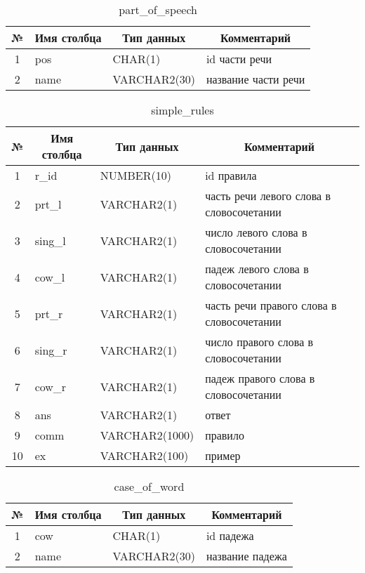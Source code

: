 \documentclass[main]{subfiles}
\begin{document}
\begin{table}[!h]
	\begin{center}
		\captionsetup{format=hang,labelsep = endash, singlelinecheck=false}
		\caption{part\_of\_speech}
		\begin{tabular}{|c|l|l|l|}
			\hline
			\textbf{№} & \multicolumn{1}{c|}{\textbf{Имя столбца}} & \multicolumn{1}{c|}{\textbf{Тип данных}} & \multicolumn{1}{c|}{\textbf{Комментарий}} \\ \hline
			1&pos &CHAR(1) & id части речи \\ \hline
			2& name& VARCHAR2(30) & название части речи \\ \hline
		\end{tabular}
	\end{center}
\end{table}
\begin{table}[!h]
	\begin{center}
		\captionsetup{format=hang,labelsep = endash, singlelinecheck=false}
		\caption{simple\_rules}
		\begin{tabular}{|c|l|l|p{220px}|}
			\hline
			\textbf{№} & \multicolumn{1}{c|}{\textbf{Имя столбца}} & \multicolumn{1}{c|}{\textbf{Тип данных}} & \multicolumn{1}{c|}{\textbf{Комментарий}} \\ \hline
			1&r\_id & NUMBER(10)&id правила\\ \hline
			2& prt\_l & VARCHAR2(1)& часть речи левого слова в словосочетании \\ \hline
			3& sing\_l &VARCHAR2(1) & число левого слова в словосочетании \\ \hline
			4& cow\_l &VARCHAR2(1) & падеж левого слова в словосочетании \\ \hline
			5& prt\_r &VARCHAR2(1) & часть речи правого слова в словосочетании \\ \hline
			6& sing\_r &VARCHAR2(1) & число правого слова в словосочетании \\ \hline
			7& cow\_r & VARCHAR2(1)& падеж правого слова в словосочетании \\ \hline
			8&ans&VARCHAR2(1)& ответ\\ \hline
			9&comm &VARCHAR2(1000)& правило\\ \hline
			10 &ex &VARCHAR2(100)&пример  \\ \hline
		\end{tabular}
	\end{center}
\end{table}
\begin{table}[!h]
	\begin{center}
		\captionsetup{format=hang,labelsep = endash, singlelinecheck=false}
		\caption{case\_of\_word}
		\begin{tabular}{|c|l|l|l|}
			\hline
			\textbf{№} & \multicolumn{1}{c|}{\textbf{Имя столбца}} & \multicolumn{1}{c|}{\textbf{Тип данных}} & \multicolumn{1}{c|}{\textbf{Комментарий}} \\ \hline
			1&cow &CHAR(1) & id падежа \\ \hline
			2& name& VARCHAR2(30) & название падежа \\ \hline
		\end{tabular}
	\end{center}
\end{table}
\end{document}
